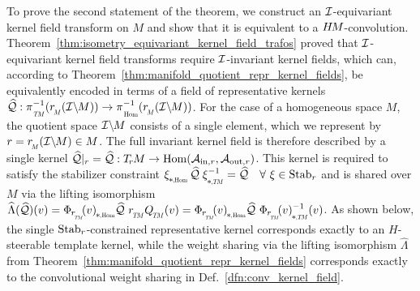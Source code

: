 To prove the second statement of the theorem, we construct an $\mathcal{I}$-equivariant kernel field transform on $M$ and show that it is equivalent to a $H\mkern-2.5muM$-convolution.
Theorem~\ref{thm:isometry_equivariant_kernel_field_trafos} proved that $\mathcal{I}$-equivariant kernel field transforms require $\mathcal{I}$-invariant kernel fields, which can, according to Theorem~\ref{thm:manifold_quotient_repr_kernel_fields}, be equivalently encoded in terms of a field of representative kernels $\Qhat: \piTM^{-1}(\rM(\IM)) \to \piHom^{-1}(\rM(\IM))$.
For the case of a homogeneous space $M$, the quotient space $\mathcal{I}\backslash\mkern-1.5mu M$ consists of a single element, which we represent by $r=\rM(\IM) \in M$.
The full invariant kernel field is therefore described by a single kernel $\Qhat|_r = \Qhat: \TrM \to \Hom(\Ainr,\Aoutr)$.
This kernel is required to satisfy the stabilizer constraint
$\dxiHom \Qhat\; \dxiTM^{-1} = \Qhat \quad \forall\ \xi \in \Stab{r}$
and is shared over $M$ via the lifting isomorphism
$\widehat{\Lambda}(\Qhat)(v) = \dPhirHom{v} \Qhat\ \rTM \QTM(v) = \dPhirHom{v} \Qhat\ \dPhirTM{v}^{-1}(v)$.
As shown below, the single $\operatorname{Stab}_{r}$-constrained representative kernel corresponds exactly to an $H$-steerable template kernel, while the weight sharing via the lifting isomorphism $\widehat{\Lambda}$ from Theorem~\ref{thm:manifold_quotient_repr_kernel_fields} corresponds exactly to the convolutional weight sharing in Def.~\ref{dfn:conv_kernel_field}.


